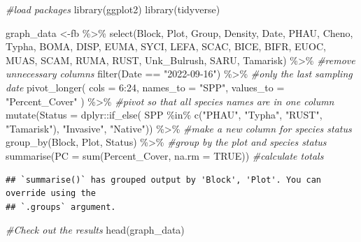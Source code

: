 \documentclass[
]{book}
\newenvironment{Shaded}{\begin{snugshade}}{\end{snugshade}}
\newcommand{\AttributeTok}[1]{\textcolor[rgb]{0.77,0.63,0.00}{#1}}
\newcommand{\CommentTok}[1]{\textcolor[rgb]{0.56,0.35,0.01}{\textit{#1}}}
\newcommand{\ConstantTok}[1]{\textcolor[rgb]{0.00,0.00,0.00}{#1}}
\newcommand{\DecValTok}[1]{\textcolor[rgb]{0.00,0.00,0.81}{#1}}
\newcommand{\FunctionTok}[1]{\textcolor[rgb]{0.00,0.00,0.00}{#1}}
\newcommand{\NormalTok}[1]{#1}
\newcommand{\OtherTok}[1]{\textcolor[rgb]{0.56,0.35,0.01}{#1}}
\newcommand{\SpecialCharTok}[1]{\textcolor[rgb]{0.00,0.00,0.00}{#1}}
\newcommand{\StringTok}[1]{\textcolor[rgb]{0.31,0.60,0.02}{#1}}
\begin{document}
\begin{Shaded}
\begin{Highlighting}[]
\CommentTok{\#load packages}
\FunctionTok{library}\NormalTok{(ggplot2)}
\FunctionTok{library}\NormalTok{(tidyverse)}

\NormalTok{graph\_data }\OtherTok{\textless{}{-}}\NormalTok{fb }\SpecialCharTok{\%\textgreater{}\%}
  \FunctionTok{select}\NormalTok{(Block, Plot, Group, Density, Date, PHAU, Cheno, Typha, }
\NormalTok{         BOMA, DISP, EUMA, SYCI, LEFA, SCAC, BICE, BIFR, EUOC, MUAS, SCAM, RUMA,}
\NormalTok{         RUST, Unk\_Bulrush, SARU, Tamarisk) }\SpecialCharTok{\%\textgreater{}\%}  \CommentTok{\#remove unnecessary columns}
  \FunctionTok{filter}\NormalTok{(Date }\SpecialCharTok{==} \StringTok{"2022{-}09{-}16"}\NormalTok{) }\SpecialCharTok{\%\textgreater{}\%}  \CommentTok{\#only the last sampling date}
  \FunctionTok{pivot\_longer}\NormalTok{(}
    \AttributeTok{cols =} \DecValTok{6}\SpecialCharTok{:}\DecValTok{24}\NormalTok{, }
    \AttributeTok{names\_to =} \StringTok{"SPP"}\NormalTok{,}
    \AttributeTok{values\_to =} \StringTok{"Percent\_Cover"}
\NormalTok{  ) }\SpecialCharTok{\%\textgreater{}\%} \CommentTok{\#pivot so that all species names are in one column}
  \FunctionTok{mutate}\NormalTok{(}\AttributeTok{Status =} 
\NormalTok{                dplyr}\SpecialCharTok{::}\FunctionTok{if\_else}\NormalTok{(}
\NormalTok{                  SPP }\SpecialCharTok{\%in\%}
                  \FunctionTok{c}\NormalTok{(}\StringTok{"PHAU"}\NormalTok{, }\StringTok{"Typha"}\NormalTok{, }\StringTok{"RUST"}\NormalTok{, }\StringTok{"Tamarisk"}\NormalTok{), }
                  \StringTok{"Invasive"}\NormalTok{, }\StringTok{"Native"}\NormalTok{)) }\SpecialCharTok{\%\textgreater{}\%}  \CommentTok{\#make a new column for species status}
  \FunctionTok{group\_by}\NormalTok{(Block, Plot, Status) }\SpecialCharTok{\%\textgreater{}\%} \CommentTok{\#group by the plot and species status}
  \FunctionTok{summarise}\NormalTok{(}\AttributeTok{PC =} \FunctionTok{sum}\NormalTok{(Percent\_Cover, }\AttributeTok{na.rm =} \ConstantTok{TRUE}\NormalTok{)) }\CommentTok{\#calculate totals}
\end{Highlighting}
\end{Shaded}

\begin{verbatim}
## `summarise()` has grouped output by 'Block', 'Plot'. You can override using the
## `.groups` argument.
\end{verbatim}

\begin{Shaded}
\begin{Highlighting}[]
\CommentTok{\#Check out the results}
\FunctionTok{head}\NormalTok{(graph\_data)}
\end{Highlighting}
\end{Shaded}
\end{document}
